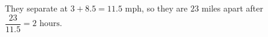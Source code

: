 They separate at $3+8.5=11.5$ mph, so they are $23$ miles apart after $\dfrac{23}{11.5}=\boxed{2\text{ hours}}$.
